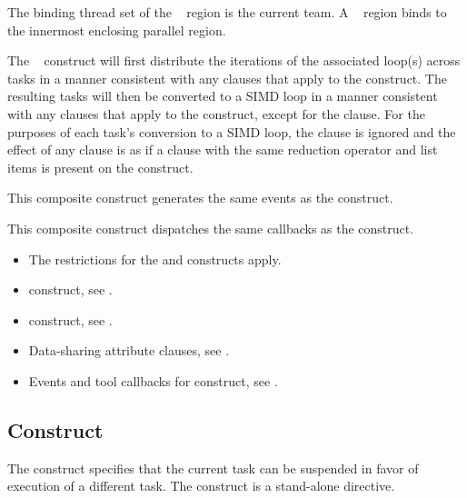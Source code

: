\binding
The binding thread set of the ~ region is the current team. A ~ region binds to the innermost enclosing parallel region.

\descr
The ~ construct will first distribute the iterations of the associated loop(s) across tasks in a manner consistent with any clauses that apply to the  construct. The resulting tasks will then be converted to a SIMD loop in a manner consistent with any clauses that apply to the  construct, except for the  clause. For the purposes of each task's conversion to a SIMD loop, the  clause is ignored and the effect of any  clause is as if a  clause with the same reduction operator and list items is present on the construct.

\events

This composite construct generates the same events as the  construct.

\tools

This composite construct dispatches the same callbacks as the  construct.

\restrictions
\begin{itemize}
\item The restrictions for the  and  constructs apply.
\end{itemize}

\crossreferences
\begin{itemize}
\item {} construct, see .
\item {} construct, see .
\item Data-sharing attribute clauses, see .
\item Events and tool callbacks for  construct, see
.

\end{itemize}



%
%
\subsection{ Construct}
\label{subsec:taskyield Construct}
\summary
The  construct specifies that the current task can be suspended in favor of
execution of a different task. The  construct is a stand-alone directive.

